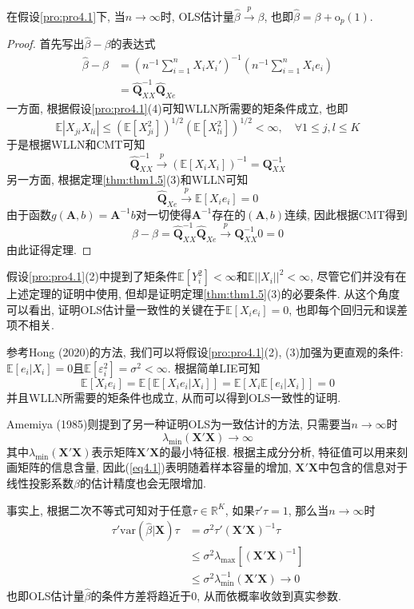 \documentclass[cn, 12pt, math=mtpro2, bibstyle=apa, blue, twocol]{elegantbook}
\newcommand{\R}{\mathbb{R}}
\newcommand{\E}{\mathbb{E}}
\newcommand{\var}{\text{var}}
\newcommand{\Q}{\mathbold{Q}}
\newcommand{\X}{\mathbold{X}}
\newcommand{\hb}{\hat{\beta}}
\begin{document}
\begin{theorem}\label{thm:thm4.7}
  在假设\ref{pro:pro4.1}下, 当$n\to\infty$时, OLS估计量$\hb\xrightarrow{p}\beta$, 也即$\hb=\beta+\text{o}_p(1)$.
\end{theorem}
\begin{proof}
  首先写出$\hb-\beta$的表达式
  \begin{align*}
  \hb-\beta&=\left(n^{-1}\sum_{i=1}^{n}X_iX_i'\right)^{-1}\left(n^{-1}\sum_{i=1}^{n}X_ie_i\right) \\
  &=\hat{\Q}_{XX}^{-1}\hat{\Q}_{Xe}
  \end{align*}
  一方面, 根据假设\ref{pro:pro4.1}(4)可知WLLN所需要的矩条件成立, 也即
  $$\E|X_{ji}X_{li}|\leq(\E[X_{ji}^2])^{1/2}(\E[X_{li}^2])^{1/2}<\infty,\quad \forall 1\leq j,l\leq K$$
  于是根据WLLN和CMT可知
  $$\hat{\Q}_{XX}^{-1}\xrightarrow{p}(\E[X_iX_i])^{-1}=\Q_{XX}^{-1}$$
  另一方面, 根据定理\ref{thm:thm1.5}(3)和WLLN可知
  $$\hat{\Q}_{Xe}\xrightarrow{p}\E[X_ie_i]=0$$
  由于函数$g(\mathbold{A},b)=\mathbold{A}^{-1}b$对一切使得$\mathbold{A}^{-1}$存在的$(\mathbold{A},b)$连续, 因此根据CMT得到
  $$\hb-\beta=\hat{\Q}_{XX}^{-1}\hat{\Q}_{Xe}\xrightarrow{p}\Q_{XX}^{-1}0=0$$
  由此证得定理.
\end{proof}
\begin{remark}
假设\ref{pro:pro4.1}(2)中提到了矩条件$\E[Y_i^2]<\infty$和$\E||X_i||^2<\infty$, 尽管它们并没有在上述定理的证明中使用, 但却是证明定理\ref{thm:thm1.5}(3)的必要条件. 从这个角度可以看出, 证明OLS估计量一致性的关键在于$\E[X_ie_i]=0$, 也即每个回归元和误差项不相关.
\end{remark}

参考Hong (2020)的方法, 我们可以将假设\ref{pro:pro4.1}(2), (3)加强为更直观的条件: $\E[e_i|X_i]=0$且$\E[\varepsilon_i^2]=\sigma^2<\infty$. 根据简单LIE可知
$$\E[X_ie_i]=\E[\E[X_ie_i|X_i]]=\E[X_i\E[e_i|X_i]]=0$$
并且WLLN所需要的矩条件也成立, 从而可以得到OLS一致性的证明.

Amemiya (1985)则提到了另一种证明OLS为一致估计的方法, 只需要当$n\to\infty$时
\begin{equation}\label{eq4.1}
  \lambda_{\min}(\X'\X)\to\infty
\end{equation}
其中$\lambda_{\min}(\mathbold{X}'\X)$表示矩阵$\X'\X$的最小特征根. 根据主成分分析, 特征值可以用来刻画矩阵的信息含量, 因此(\ref{eq4.1})表明随着样本容量的增加, $\X'\X$中包含的信息对于线性投影系数$\beta$的估计精度也会无限增加.

事实上, 根据二次不等式可知对于任意$\tau\in\R^K$, 如果$\tau'\tau=1$, 那么当$n\to\infty$时
\begin{align*}
\tau'\var(\hb|\X)\tau&=\sigma^2\tau'(\X'\X)^{-1}\tau \\
&\leq \sigma^2\lambda_{\max}[(\X'\X)^{-1}]\\
&\leq \sigma^2\lambda_{\min}^{-1}(\X'\X)\to0
\end{align*}
也即OLS估计量$\hb$的条件方差将趋近于0, 从而依概率收敛到真实参数.
\end{document}
